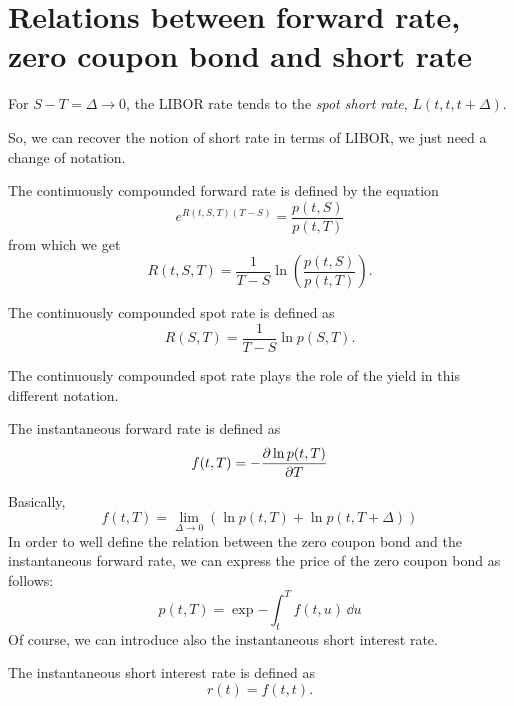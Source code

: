 \section{Relations between forward rate, zero coupon bond and short rate}
\begin{remark} %
    For $S-T=\Delta\to 0$, the LIBOR rate tends to the \emph{spot short rate}, $L(t,t,t+\Delta)$.
\end{remark}
So, we can recover the notion of short rate in terms of LIBOR, we just need a change of notation.
\begin{definition}
    The continuously compounded forward rate is defined by the equation
    \begin{equation}
        e^{R(t,S,T)(T-S)} = \frac{p(t,S)}{p(t,T)}
    \end{equation}
    from which we get
    \begin{equation}
        R(t,S,T) = \frac{1}{T-S}\ln\left(\frac{p(t,S)}{p(t,T)}\right).
    \end{equation}
\end{definition}
\begin{definition}
    The continuously compounded spot rate is defined as
    \begin{equation}
        R(S,T) = \frac{1}{T-S}\ln p(S,T).
    \end{equation}
\end{definition}
The continuously compounded spot rate plays the role of the yield in this different notation.
\begin{definition}
    The instantaneous forward rate is defined as
    \begin{equation}\label{forwrate}
        f(t,T) = -\pdv{\ln p(t,T)}{T}
    \end{equation}
\end{definition}
Basically,
\begin{equation}
    f(t,T) = \lim_{\Delta \to 0} (\ln p(t,T) + \ln p(t, T+\Delta))
\end{equation}
In order to well define the relation between the zero coupon bond and the instantaneous forward rate, we can express the price of the zero coupon bond as follows:
\begin{equation}
    p(t,T) = \exp{-\int_t^T f(t,u)\,\dd u}
\end{equation}
Of course, we can introduce also the instantaneous short interest rate.
\begin{definition}
    The instantaneous short interest rate is defined as
    \begin{equation}
        r(t) = f(t,t).
    \end{equation}
\end{definition}
